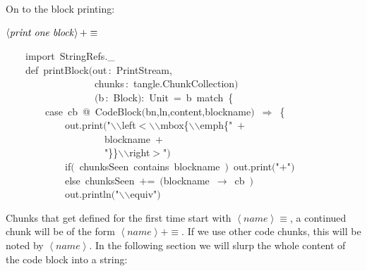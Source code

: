 \documentclass[a4paper,12pt]{article}
\begin{document}
On to the block printing:

$\left<\mbox{\emph{print one block}}\right>+\equiv$
\begin{program}~~~~{\vem import}~StringRefs.\_
\\~~~~{\vem def}~printBlock$($out\,{\rm :}~PrintStream,
\\~~~~~~~~~~~~~~~~~~chunks\,{\rm :}~tangle.ChunkCollection$)$
\\~~~~~~~~~~~~~~~~~~$($b\,{\rm :}~Block$)${\rm :}~Unit~=~b~{\vem match}~{\small\{}
\\~~~~~~~~{\vem case}~cb~@~CodeBlock$($bn,ln,content,blockname$)$~$\Rightarrow$~{\small\{}
\\~~~~~~~~~~~~out.print$($"\Dollar$\backslash$$\backslash$left$<$$\backslash$$\backslash$mbox{\small\{}$\backslash$$\backslash$emph{\small\{}"~$+$
\\~~~~~~~~~~~~~~~~~~~~blockname~$+$
\\~~~~~~~~~~~~~~~~~~~~"{\small\}}{\small\}}$\backslash$$\backslash$right$>$"$)$
\\[0.5em]~~~~~~~~~~~~{\vem if}$($~chunksSeen~contains~blockname~$)$~out.print$($"$+$"$)$
\\~~~~~~~~~~~~{\vem else}~chunksSeen~$+$=~$($blockname~$\rightarrow$~cb~$)$
\\[0.5em]~~~~~~~~~~~~out.println$($"$\backslash$$\backslash$equiv\Dollar"$)$
\\[0.5em]\end{program}



Chunks that get defined for the first time start with
$\left<name\right>\equiv$, a continued chunk will be of the
form $\left<name\right>+\equiv$. If we use other code chunks,
this will be noted by $\left<name\right>$. In the following
section we will slurp the whole content of the code block
into a string:
\end{document}
